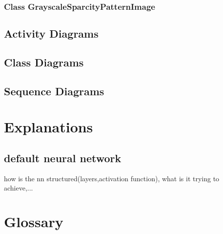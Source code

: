 \documentclass[parskip=full]{scrartcl}
\begin{document}
\subsubsection{Class GrayscaleSparcityPatternImage}

\subsection{Activity Diagrams}



\subsection{Class Diagrams}



\subsection{Sequence Diagrams}

\section{Explanations}
\subsection{default neural network}
how is the nn structured(layers,activation function), what is it trying to achieve,...

\section{Glossary}

%
\printnoidxglossaries
\end{document}
